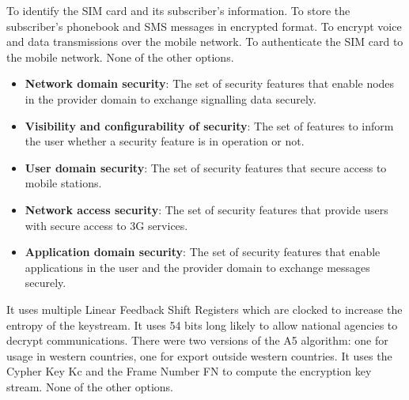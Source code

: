 \begin{checkboxes}
    \choice To identify the SIM card and its subscriber's information.
    \choice To store the subscriber's phonebook and SMS messages in encrypted format.
    \choice To encrypt voice and data transmissions over the mobile network.
    \CorrectChoice To authenticate the SIM card to the mobile network.
    \choice None of the other options.
\end{checkboxes}

\begin{solution}
    \begin{itemize}
        \item \textbf{Network domain security}: The set of security features that enable nodes in the provider domain to exchange signalling data securely.
        \item \textbf{Visibility and configurability of security}: The set of features to inform the user whether a security feature is in operation or not.
        \item \textbf{User domain security}: The set of security features that secure access to mobile stations.
        \item \textbf{Network access security}: The set of security features that provide users with secure access to 3G services.
        \item \textbf{Application domain security}: The set of security features that enable applications in the user and the provider domain to exchange messages securely.
    \end{itemize}
\end{solution}


\begin{checkboxes}
    \CorrectChoice It uses multiple Linear Feedback Shift Registers which are clocked to increase the entropy of the keystream.
    \CorrectChoice It uses 54 bits long likely to allow national agencies to decrypt communications.
    \CorrectChoice There were two versions of the A5 algorithm: one for usage in western countries, one for export outside western countries.
    \CorrectChoice It uses the Cypher Key Kc and the Frame Number FN to compute the encryption key stream.
    \choice None of the other options.
\end{checkboxes}

